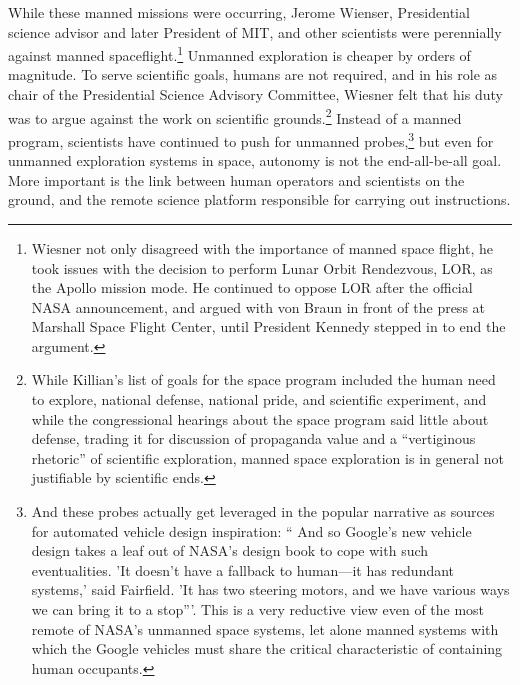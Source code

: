 While these manned missions were occurring, Jerome Wienser,
Presidential science advisor and later President of MIT, and other
scientists were perennially against manned
spaceflight.\footnote{Wiesner not only disagreed with the importance
  of manned space flight, he took issues with the decision to perform
  Lunar Orbit Rendezvous, LOR, as the Apollo mission mode. He
  continued to oppose LOR after the official NASA announcement, and
  argued with von Braun in front of the
  press at Marshall Space Flight Center, until President Kennedy
  stepped in to end the argument\cite{???}.} Unmanned exploration is
cheaper by orders of magnitude\cite[p. 66]{???-coxMurray}. To serve
scientific goals, humans are not required, and in his role as chair of
the Presidential Science Advisory Committee, Wiesner felt that his
duty was to argue against the work on scientific
grounds\cite{???}.\footnote{While Killian's list of goals for the
  space program included the human need to explore, national defense,
  national pride, and scientific experiment, and while the
  congressional hearings about the space program said little about
  defense, trading it for discussion of propaganda value and a
  ``vertiginous rhetoric'' of scientific exploration, manned space
  exploration is in general not justifiable by scientific ends\cite[p.
    194-197]{smithSelling}.} Instead of a manned program, scientists
have continued to push for unmanned probes,\footnote{And these probes
  actually get leveraged in the popular narrative as sources for
  automated vehicle design inspiration: `` And so Google’s new vehicle
  design 
takes a leaf out of NASA’s design book to cope with such
eventualities. 'It doesn’t have a fallback to human—it has redundant
systems,' said Fairfield. 'It has two steering motors, and we have
various ways we can bring it to a stop'''\cite{simonite}. This is a
very reductive view even of the most remote of NASA's unmanned space
systems, let alone manned systems with which the Google vehicles must share
the critical characteristic of containing human occupants.} but even for
unmanned exploration systems in space, autonomy is not the
end-all-be-all goal. More important is the link between human
operators and scientists on the ground, and the remote science
platform responsible for carrying out instructions. 

